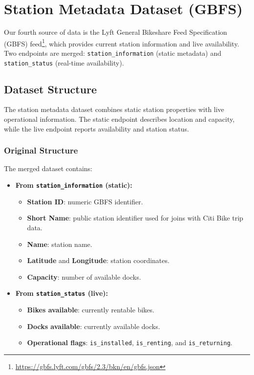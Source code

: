 \section{Station Metadata Dataset (GBFS)}

Our fourth source of data is the Lyft General Bikeshare Feed Specification (GBFS) feed\footnote{\url{https://gbfs.lyft.com/gbfs/2.3/bkn/en/gbfs.json}}, which provides current station information and live availability. Two endpoints are merged: \texttt{station\_information} (static metadata) and \texttt{station\_status} (real-time availability).

\subsection{Dataset Structure}

The station metadata dataset combines static station properties with live operational information. The static endpoint describes location and capacity, while the live endpoint reports availability and station status.

\subsubsection{Original Structure}

The merged dataset contains:

\begin{itemize}
    \item \textbf{From \texttt{station\_information} (static):}
    \begin{itemize}
        \item \textbf{Station ID}: numeric GBFS identifier.
        \item \textbf{Short Name}: public station identifier used for joins with Citi Bike trip data.
        \item \textbf{Name}: station name.
        \item \textbf{Latitude} and \textbf{Longitude}: station coordinates.
        \item \textbf{Capacity}: number of available docks.
    \end{itemize}

    \item \textbf{From \texttt{station\_status} (live):}
    \begin{itemize}
        \item \textbf{Bikes available}: currently rentable bikes.
        \item \textbf{Docks available}: currently available docks.
        \item \textbf{Operational flags}: \texttt{is\_installed}, \texttt{is\_renting}, and \texttt{is\_returning}.
    \end{itemize}
\end{itemize}

